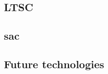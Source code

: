 
\chapter{}
\label{ch:toekomstvisie}
\section{LTSC}
\section{\acrfull{sac}}
\section{Future technologies}

